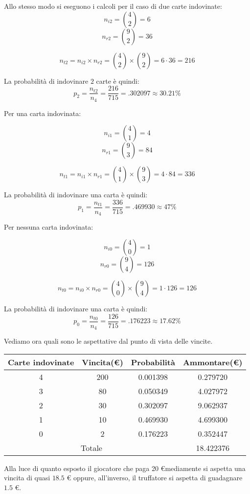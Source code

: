 Allo stesso modo si eseguono i calcoli per il caso di due carte indovinate:
\[
n_{i2}=\binom{4}{2}=6
\]
\[
n_{r2}=\binom{9}{2}=36
\]

\[
n_{t2}=n_{i2}\times n_{r2}=\binom{4}{2}\times\binom{9}{2}=6\cdot 36=216
\]


La probabilità di indovinare $2$ carte è quindi:
\[
p_2=\frac{n_{t2}}{n_4}=\frac{216}{715}=.302097\approx 30.21\%
\]

Per una carta indovinata:


\[
n_{i1}=\binom{4}{1}=4
\]
\[
n_{r1}=\binom{9}{3}=84
\]

\[
n_{t1}=n_{i1}\times n_{r1}=\binom{4}{1}\times\binom{9}{3}=4\cdot 84=336
\]


La probabilità di indovinare una carta è quindi:
\[
p_1=\frac{n_{t1}}{n_4}=\frac{336}{715}=.469930\approx 47\%
\]

Per nessuna carta indovinata:



\[
n_{i0}=\binom{4}{0}=1
\]
\[
n_{r0}=\binom{9}{4}=126
\]

\[
n_{t0}=n_{i0}\times n_{r0}=\binom{4}{0}\times\binom{9}{4}=1\cdot 126=126
\]


La probabilità di indovinare una carta è quindi:
\[
p_0=\frac{n_{t0}}{n_4}=\frac{126}{715}=.176223\approx 17.62\%
\]

Vediamo ora quali sono le aspettative dal punto di vista delle vincite.


\begin{table}[H]
\begin{tabular}{@{}|c|c|c|c|@{}}
\hline
Carte indovinate & Vincita(\euro)     & Probabilità   & Ammontare(\euro) \\
\hline
4                & 200         & 0.001398      & 0.279720 \\
3                & 80          & 0.050349      & 4.027972 \\
2                & 30          & 0.302097      & 9.062937 \\
1                & 10          & 0.469930      & 4.699300 \\
0                & 2           & 0.176223      & 0.352447 \\
\hline
\hline
\multicolumn{3}{|c|}{Totale}                 & 18.422376\\
\hline
\end{tabular}
\end{table}

Alla luce di quanto esposto il giocatore che paga 20 \euro\hspace{1mm}mediamente si
aspetta una vincita di quasi $18.5$ \euro \hspace{1mm} oppure, all'inverso, 
il truffatore si aspetta di guadagnare $1.5$  \hspace{1mm} \euro.

